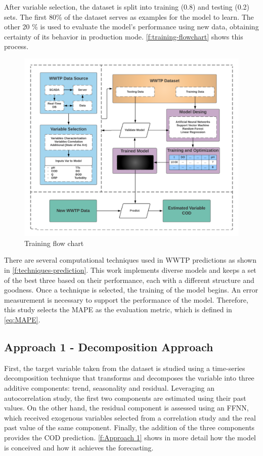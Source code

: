 After variable selection, the dataset is split into training (0.8) and testing (0.2) sets. The first 80\% of the dataset serves as examples for the model to learn. The other 20 \% is used to evaluate the model's performance using new data, obtaining certainty of its behavior in production mode. \autoref{f:training-flowchart} shows this process.

\begin{figure}[h]
\centering
\includegraphics[width=\linewidth]{figures/Ch4/training-FlowChart.pdf}
\caption{Training flow chart}
\label{f:training-flowchart}
\end{figure}

There are several computational techniques used in \ac{WWTP} predictions as shown in \autoref{f:techniques-prediction}. This work implements diverse models and keeps a set of the best three based on their performance, each with a different structure and goodness. Once a technique is selected, the training of the model begins. An error measurement is necessary to support the performance of the model. Therefore, this study selects the \ac{MAPE} as the evaluation metric, which is defined in \autoref{eq:MAPE}.

\subsection{Approach 1 - Decomposition Approach}
\label{s:Approach1}

First, the target variable taken from the dataset is studied using a time-series decomposition technique that transforms and decomposes the variable into three additive components: trend, seasonality and residual. Leveraging an autocorrelation study, the first two components are estimated using their past values. On the other hand, the residual component is assessed using an \ac{FFNN}, which received exogenous variables selected from a correlation study and the real past value of the same component. Finally, the addition of the three components provides the \ac{COD} prediction. \autoref{f:Approach 1} shows in more detail how the model is conceived and how it achieves the forecasting.


